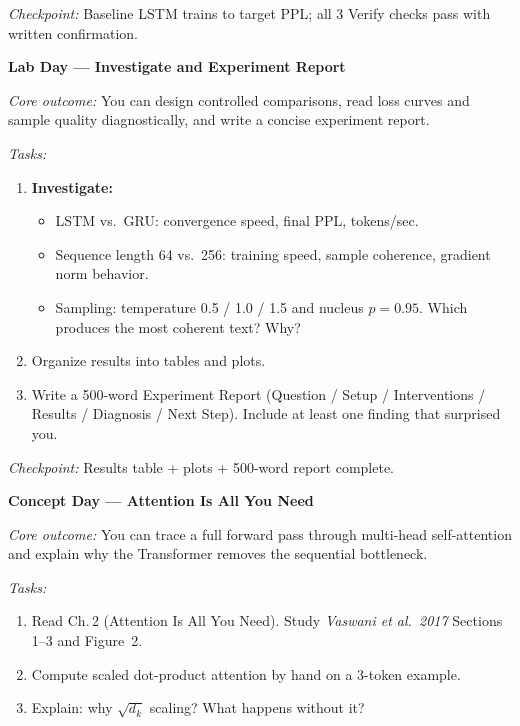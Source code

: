 \begin{description}[style=nextline, leftmargin=1.8cm, labelwidth=1.5cm]
\textit{Checkpoint:} Baseline LSTM trains to target PPL; all 3 Verify checks pass with written confirmation.

\item[Day 3] \textbf{Lab Day --- Investigate and Experiment Report}

\textit{Core outcome:} You can design controlled comparisons, read loss curves and sample quality diagnostically, and write a concise experiment report.

\textit{Tasks:}
\begin{enumerate}
    \item \textbf{Investigate:}
    \begin{itemize}
        \item LSTM vs.\ GRU: convergence speed, final PPL, tokens/sec.
        \item Sequence length 64 vs.\ 256: training speed, sample coherence, gradient norm behavior.
        \item Sampling: temperature 0.5 / 1.0 / 1.5 and nucleus $p = 0.95$. Which produces the most coherent text? Why?
    \end{itemize}
    \item Organize results into tables and plots.
    \item Write a 500-word Experiment Report (Question / Setup / Interventions / Results / Diagnosis / Next Step). Include at least one finding that surprised you.
\end{enumerate}

\textit{Checkpoint:} Results table + plots + 500-word report complete.


\item[Day 4] \textbf{Concept Day --- Attention Is All You Need}

\textit{Core outcome:} You can trace a full forward pass through multi-head self-attention and explain why the Transformer removes the sequential bottleneck.

\textit{Tasks:}
\begin{enumerate}
    \item Read Ch.\,2 (Attention Is All You Need). Study \emph{Vaswani et al.\ 2017} Sections 1--3 and Figure~2.
    \item Compute scaled dot-product attention by hand on a 3-token example.
    \item Explain: why $\sqrt{d_k}$ scaling? What happens without it?
\end{enumerate}


\end{description}
